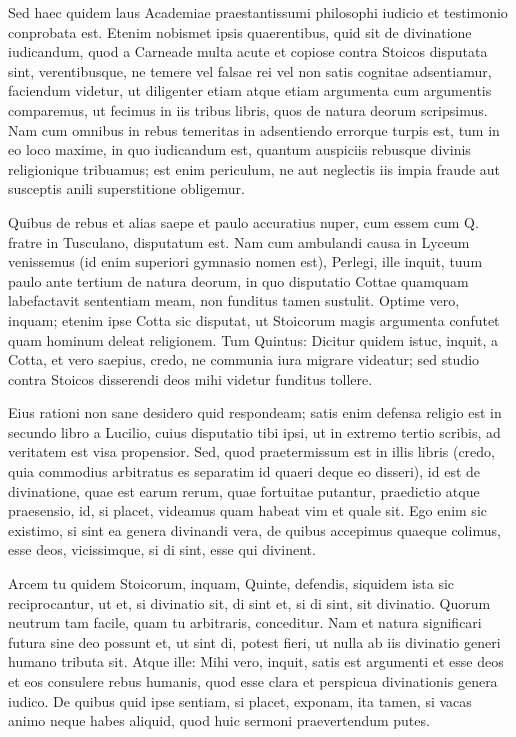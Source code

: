  Sed haec quidem laus Academiae praestantissumi philosophi iudicio et testimonio conprobata est. Etenim nobismet ipsis quaerentibus, quid sit de divinatione iudicandum, quod a Carneade multa acute et copiose contra Stoicos disputata sint, verentibusque, ne temere vel falsae rei vel non satis cognitae adsentiamur, faciendum videtur, ut diligenter etiam atque etiam argumenta cum argumentis comparemus, ut fecimus in iis tribus libris, quos de natura deorum scripsimus. Nam cum omnibus in rebus temeritas in adsentiendo errorque turpis est, tum in eo loco maxime, in quo iudicandum est, quantum auspiciis rebusque divinis religionique tribuamus; est enim periculum, ne aut neglectis iis impia fraude aut susceptis anili superstitione obligemur.

 Quibus de rebus et alias saepe et paulo accuratius nuper, cum essem cum Q. fratre in Tusculano, disputatum est. Nam cum ambulandi causa in Lyceum venissemus (id enim superiori gymnasio nomen est), Perlegi, ille inquit, tuum paulo ante tertium de natura deorum, in quo disputatio Cottae quamquam labefactavit sententiam meam, non funditus tamen sustulit. Optime vero, inquam; etenim ipse Cotta sic disputat, ut Stoicorum magis argumenta confutet quam hominum deleat religionem. Tum Quintus: Dicitur quidem istuc, inquit, a Cotta, et vero saepius, credo, ne communia iura migrare videatur; sed studio contra Stoicos disserendi deos mihi videtur funditus tollere.

 Eius rationi non sane desidero quid respondeam; satis enim defensa religio est in secundo libro a Lucilio, cuius disputatio tibi ipsi, ut in extremo tertio scribis, ad veritatem est visa propensior. Sed, quod praetermissum est in illis libris (credo, quia commodius arbitratus es separatim id quaeri deque eo disseri), id est de divinatione, quae est earum rerum, quae fortuitae putantur, praedictio atque praesensio, id, si placet, videamus quam habeat vim et quale sit. Ego enim sic existimo, si sint ea genera divinandi vera, de quibus accepimus quaeque colimus, esse deos, vicissimque, si di sint, esse qui divinent.

 Arcem tu quidem Stoicorum, inquam, Quinte, defendis, siquidem ista sic reciprocantur, ut et, si divinatio sit, di sint et, si di sint, sit divinatio. Quorum neutrum tam facile, quam tu arbitraris, conceditur. Nam et natura significari futura sine deo possunt et, ut sint di, potest fieri, ut nulla ab iis divinatio generi humano tributa sit. Atque ille: Mihi vero, inquit, satis est argumenti et esse deos et eos consulere rebus humanis, quod esse clara et perspicua divinationis genera iudico. De quibus quid ipse sentiam, si placet, exponam, ita tamen, si vacas animo neque habes aliquid, quod huic sermoni praevertendum putes.

